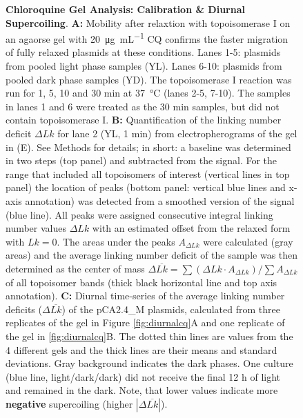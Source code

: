 \documentclass[10pt,letterpaper]{article}
\newcommand{\ugml}{\micro\gram\per\milli\liter}
\begin{document}
\begin{figure}
  \caption{\textbf{Chloroquine Gel Analysis: Calibration \& Diurnal
      Supercoiling}. \small{\textbf{A:} Mobility after relaxtion with
      topoisomerase I on an agaorse gel with \SI{20}{\ugml} CQ
      confirms the faster migration of fully relaxed plasmids at these
      conditions. Lanes 1-5: plasmids from pooled light phase samples
      (YL). Lanes 6-10: plasmids from pooled dark phase samples
      (YD). The topoisomerase I reaction was run for 1, 5, 10 and 30
      min at \SI{37}{\celsius} (lanes 2-5, 7-10). The samples in lanes
      1 and 6 were treated as the 30 min samples, but did not contain
      topoisomerase I. \textbf{B:} Quantification of the linking
      number deficit $\Delta Lk$ for lane 2 (YL, 1 min) from
      electropherograms of the gel in (E).  See Methods for details;
      in short: a baseline was determined in two steps (top panel) and
      subtracted from the signal. For the range that included all
      topoisomers of interest (vertical lines in top panel) the
      location of peaks (bottom panel: vertical blue lines and x-axis
      annotation) was detected from a smoothed version of the signal
      (blue line). All peaks were assigned consecutive integral
      linking number values $\Delta Lk$ with an estimated offset from
      the relaxed form with $Lk=0$. The areas under the peaks
      $A_{\Delta Lk}$ were calculated (gray areas) and the average
      linking number deficit of the sample was then determined as the
      center of mass $\Delta \overline{Lk} = \sum{(\Delta Lk \cdot
        A_{\Delta Lk})}/\sum{A_{\Delta Lk}}$ of all topoisomer bands
      (thick black horizontal line and top axis
      annotation). \textbf{C:} Diurnal time-series of the average
      linking number deficits ($\Delta \overline{Lk}$) of the
      pCA2.4\_M plasmids, calculated from three replicates of the gel
      in Figure \ref{fig:diurnalcq}A and one replicate of the gel in
      \ref{fig:diurnalcq}B.  The dotted thin lines are values from
      the 4 different gels and the thick lines are their means and
      standard deviations.  Gray background indicates the dark
      phases. One culture (blue line, light/dark/dark) did not receive
      the final 12 h of light and remained in the dark.  Note, that
      lower values indicate more \textbf{negative} supercoiling
      (higher $|\Delta \overline{Lk}|$).}}
  \label{fig:topoi} 
\end{figure}

   
\end{document}
